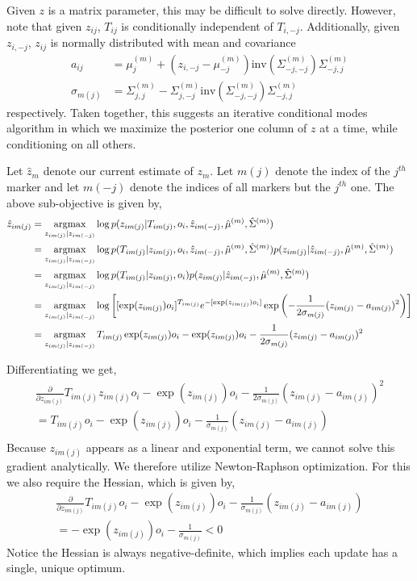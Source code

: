 \documentclass[10pt]{article}
\newcommand{\argmax}{\operatornamewithlimits{argmax}}
\begin{document}
Given $z$ is a matrix parameter, this may be difficult to solve directly. However, note that given $z_{ij}$, $T_{ij}$ is conditionally independent of $T_{i,-j}$. Additionally, given $z_{i,-j}$, $z_{ij}$ is normally distributed with mean and covariance 
\begin{align*}
a_{ij} & = \mu^{(m)}_j + \left(z_{i,-j} - \mu^{(m)}_{-j} \right)\textrm{inv}\left( \Sigma^{(m)}_{-j,-j} \right) \Sigma^{(m)}_{-j,j} \\
\sigma_{m(j)} &= \Sigma^{(m)}_{j,j} - \Sigma^{(m)}_{j,-j}\textrm{inv}\left( \Sigma^{(m)}_{-j,-j} \right) \Sigma^{(m)}_{-j,j}
\end{align*}
respectively. Taken together, this suggests an iterative conditional modes algorithm \cite{Besag1986} in which we maximize the posterior one column of $z$ at a time, while conditioning on all others. 

Let $\hat{z}_m$ denote our current estimate of $z_m$. Let $m(j)$ denote the index of the $j^{th}$ marker and let $m(-j)$ denote the indices of all markers but the $j^{th}$ one. The above sub-objective is given by,
\begin{align*}
\hat{z}_{im(j)} & = \argmax_{z_{im(j)} | z_{im(-j)}} \log p(z_{im(j)} | T_{im(j)}, o_i, \hat{z}_{im(-j)}, \hat{\mu}^{(m)}, \hat{\Sigma}^{(m)}) \\
& = \argmax_{z_{im(j)} | z_{im(-j)} } \log p(T_{im(j)} | z_{im(j)},  o_i, \hat{z}_{im(-j)}, \hat{\mu}^{(m)}, \hat{\Sigma}^{(m)})p(z_{im(j)} | \hat{z}_{im(-j)}, \hat{\mu}^{(m)}, \hat{\Sigma}^{(m)})  \\
& = \argmax_{z_{im(j)} | z_{im(-j)} } \log p(T_{im(j)} | z_{im(j)}, o_i)p(z_{im(j)} | \hat{z}_{im(-j)}, \hat{\mu}^{(m)}, \hat{\Sigma}^{(m)})  \\
& = \argmax_{z_{im(j)} | z_{im(-j)} } \log \left[ [\exp(z_{im(j)})o_i]^{T_{im(j)}}  e^{-[\exp(z_{im(j)})o_i]} \exp \left( -\frac{1}{2\sigma_{m(j)}}(z_{im(j)} - a_{im(j)})^2 \right) \right] \\
& = \argmax_{z_{im(j)} | z_{im(-j)} }  T_{im(j)}\exp(z_{im(j)})o_i -\exp(z_{im(j)})o_i  -\frac{1}{2\sigma_{m(j)}}(z_{im(j)} - a_{im(j)})^2 
\end{align*}


Differentiating we get,
\begin{align*}
\frac{\partial}{\partial z_{im(j)}}  T_{im(j)}z_{im(j)}o_i - \exp(z_{im(j)})o_i  -\frac{1}{2\sigma_{m(j)}}(z_{im(j)} - a_{im(j)})^2 \\ 
= T_{im(j)}o_i - \exp(z_{im(j)})o_i  -\frac{1}{\sigma_{m(j)}}(z_{im(j)} - a_{im(j)}) \\ 
\end{align*}
Because $z_{im(j)}$ appears as a linear and exponential term, we cannot solve this gradient analytically. We therefore utilize Newton-Raphson optimization. For this we also require the Hessian, which is given by,  
\begin{align*}
\frac{\partial}{\partial z_{im(j)}} T_{im(j)}o_i - \exp(z_{im(j)})o_i  -\frac{1}{\sigma_{m(j)}}(z_{im(j)} - a_{im(j)}) \\ 
=  -\exp(z_{im(j)})o_i  - \frac{1}{\sigma_{m(j)}} < 0
\end{align*}
Notice the Hessian is always negative-definite, which implies each update has a single, unique optimum. 
\end{document}
